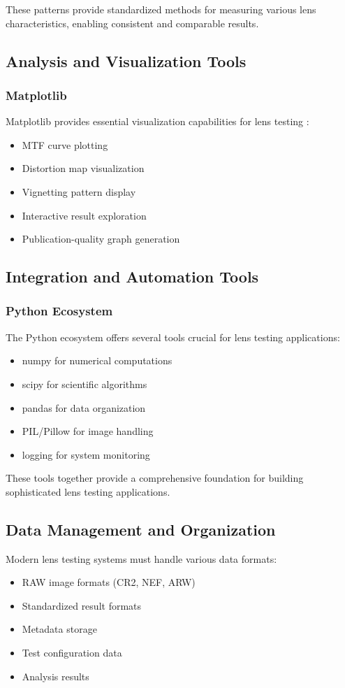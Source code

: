 These patterns provide standardized methods for measuring various lens characteristics, enabling consistent and comparable results.

\subsection{Analysis and Visualization Tools}
\subsubsection{Matplotlib}
Matplotlib provides essential visualization capabilities for lens testing \cite{matplotlib}:
\begin{itemize}
    \item MTF curve plotting
    \item Distortion map visualization
    \item Vignetting pattern display
    \item Interactive result exploration
    \item Publication-quality graph generation
\end{itemize}

\subsection{Integration and Automation Tools}
\subsubsection{Python Ecosystem}
The Python ecosystem offers several tools crucial for lens testing applications:
\begin{itemize}
    \item numpy for numerical computations \cite{numpy}
    \item scipy for scientific algorithms
    \item pandas for data organization
    \item PIL/Pillow for image handling
    \item logging for system monitoring
\end{itemize}

These tools together provide a comprehensive foundation for building sophisticated lens testing applications.

\subsection{Data Management and Organization}
Modern lens testing systems must handle various data formats:
\begin{itemize}
    \item RAW image formats (CR2, NEF, ARW)
    \item Standardized result formats
    \item Metadata storage
    \item Test configuration data
    \item Analysis results
\end{itemize}

